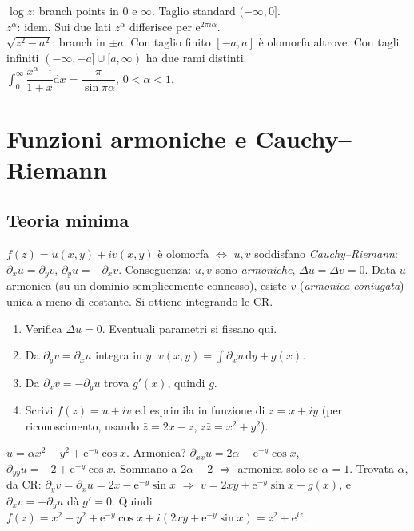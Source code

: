 \documentclass[11pt,a4paper,openany]{book}
\theoremstyle{definition}
\newcommand{\dd}{\mathrm{d}}
\newcommand{\eu}{\mathrm{e}}
\begin{document}
\begin{formulario}
$\log z$: branch points in $0$ e $\infty$. Taglio standard $(-\infty,0]$.\\
$z^\alpha$: idem. Sui due lati $z^\alpha$ differisce per $\eu^{2\pi i\alpha}$.\\
$\sqrt{z^2-a^2}$: branch in $\pm a$. Con taglio finito $[-a,a]$ \`e olomorfa altrove. Con tagli infiniti $(-\infty,-a]\cup[a,\infty)$ ha due rami distinti.\\
$\int_0^\infty\dfrac{x^{\alpha-1}}{1+x}\dd x=\dfrac{\pi}{\sin\pi\alpha}$, $0<\alpha<1$.
\end{formulario}

\chapter{Funzioni armoniche e Cauchy--Riemann}

\section{Teoria minima}

\begin{teoria}
$f(z)=u(x,y)+iv(x,y)$ \`e olomorfa $\iff$ $u,v$ soddisfano \emph{Cauchy--Riemann}: $\partial_x u=\partial_y v$, $\partial_y u=-\partial_x v$.
Conseguenza: $u,v$ sono \emph{armoniche}, $\Delta u=\Delta v=0$.
Data $u$ armonica (su un dominio semplicemente connesso), esiste $v$ (\emph{armonica coniugata}) unica a meno di costante. Si ottiene integrando le CR.
\end{teoria}

\begin{algoritmo}
\begin{enumerate}
\item Verifica $\Delta u=0$. Eventuali parametri si fissano qui.
\item Da $\partial_y v=\partial_x u$ integra in $y$: $v(x,y)=\int\partial_x u\,\dd y+g(x)$.
\item Da $\partial_x v=-\partial_y u$ trova $g'(x)$, quindi $g$.
\item Scrivi $f(z)=u+iv$ ed esprimila in funzione di $z=x+iy$ (per riconoscimento, usando $\bar z=2x-z$, $z\bar z=x^2+y^2$).
\end{enumerate}
\end{algoritmo}

\begin{esempio}[Scritto 03/07/2024, Es. 1]
$u=\alpha x^2-y^2+\eu^{-y}\cos x$. Armonica? $\partial_{xx}u=2\alpha-\eu^{-y}\cos x$, $\partial_{yy}u=-2+\eu^{-y}\cos x$. Sommano a $2\alpha-2$ $\Rightarrow$ armonica solo se $\alpha=1$. Trovata $\alpha$, da CR: $\partial_y v=\partial_x u=2x-\eu^{-y}\sin x$ $\Rightarrow$ $v=2xy+\eu^{-y}\sin x+g(x)$, e $\partial_x v=-\partial_y u$ d\`a $g'=0$. Quindi $f(z)=x^2-y^2+\eu^{-y}\cos x+i(2xy+\eu^{-y}\sin x)=z^2+\eu^{iz}$.
\end{esempio}
\end{document}
